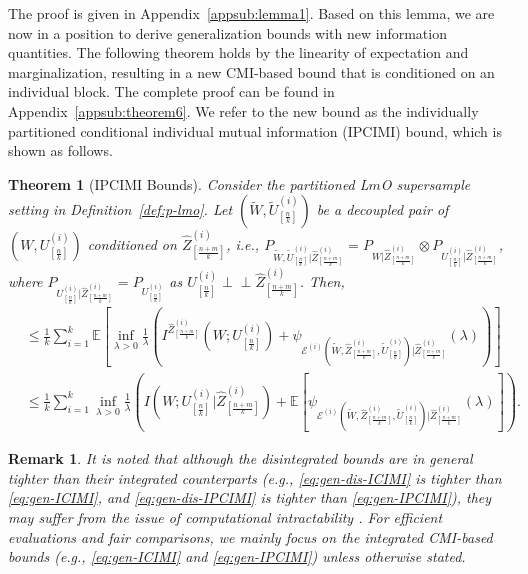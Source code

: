 \documentclass[onecolumn,romanappendices,10pt]{IEEEtran}
\newtheorem{theorem}{Theorem}
\newtheorem{remark}{Remark}
\newcommand{\EE}{{\mathbb{E}}}
\DeclareMathOperator{\gen}{\overline{gen}}
\newcommand\indep{ \perp \!\!\! \perp}
\begin{document}
	The proof is given in Appendix~\ref{appsub:lemma1}. Based on this lemma, we are now in a position to derive generalization bounds with new information quantities. The following theorem holds by the linearity of expectation and marginalization, resulting in a new CMI-based bound that is conditioned on an individual block. The complete proof can be found in Appendix~\ref{appsub:theorem6}. We refer to the new bound as the individually partitioned conditional individual mutual information (IPCIMI) bound, which is shown as follows. 
	\begin{theorem}[IPCIMI Bounds] \label{thm:IPCIMI}
		Consider the partitioned L$m$O supersample setting in Definition~\ref{def:p-lmo}. Let $(\tilde{W}, \tilde{U}^{(i)}_{[\frac{n}{k}]})$ be a decoupled pair of $(W, U^{(i)}_{[\frac{n}{k}]})$ conditioned on $\hat{Z}^{(i)}_{[\frac{n+m}{k}]}$, i.e., $P_{\tilde{W},\tilde{U}^{(i)}_{[\frac{n}{k}]} | \hat{Z}^{(i)}_{[\frac{n+m}{k}]}} = P_{W | \hat{Z}^{(i)}_{[\frac{n+m}{k}]}} \otimes P_{U^{(i)}_{[\frac{n}{k}]} | \hat{Z}^{(i)}_{[\frac{n+m}{k}]}}$, where $P_{U^{(i)}_{[\frac{n}{k}]} | \hat{Z}^{(i)}_{[\frac{n+m}{k}]}} = P_{U^{(i)}_{[\frac{n}{k}]}}$ as $U^{(i)}_{[\frac{n}{k}]} \indep \hat{Z}^{(i)}_{[\frac{n+m}{k}]}$. Then,
		\begin{align}
			\gen &\leq \frac{1}{k} \sum_{i=1}^{k} \EE \left[ \inf_{\lambda > 0} \frac{1}{\lambda} \left( I^{\hat{Z}^{(i)}_{[\frac{n+m}{k}]}}\left( W; U^{(i)}_{[\frac{n}{k}]} \right) + \psi_{\mathcal{E}^{(i)}(\tilde{W}, \hat{Z}^{(i)}_{[\frac{n+m}{k}]}, \tilde{U}^{(i)}_{[\frac{n}{k}]}) | \hat{Z}^{(i)}_{[\frac{n+m}{k}]}}(\lambda) \right) \right] \label{eq:gen-dis-IPCIMI}\\
			&\leq \frac{1}{k} \sum_{i=1}^{k} \inf_{\lambda > 0} \frac{1}{\lambda} \left(I\left( W; U^{(i)}_{[\frac{n}{k}]} | \hat{Z}^{(i)}_{[\frac{n+m}{k}]} \right) + \EE \left[ \psi_{\mathcal{E}^{(i)}(\tilde{W}, \hat{Z}^{(i)}_{[\frac{n+m}{k}]}, \tilde{U}^{(i)}_{[\frac{n}{k}]}) | \hat{Z}^{(i)}_{[\frac{n+m}{k}]}}(\lambda) \right] \right). \label{eq:gen-IPCIMI}
		\end{align}
	\end{theorem}
	
	\begin{remark}
		It is noted that although the disintegrated bounds are in general tighter than their integrated counterparts (e.g., \eqref{eq:gen-dis-ICIMI} is tighter than \eqref{eq:gen-ICIMI}, and \eqref{eq:gen-dis-IPCIMI} is tighter than \eqref{eq:gen-IPCIMI}), they may suffer from the issue of computational intractability \cite{haghifam2020sharpened,zhou2022individually}. For efficient evaluations and fair comparisons, we mainly focus on the integrated CMI-based bounds (e.g., \eqref{eq:gen-ICIMI} and \eqref{eq:gen-IPCIMI}) unless otherwise stated.
	\end{remark}
	
\end{document}
